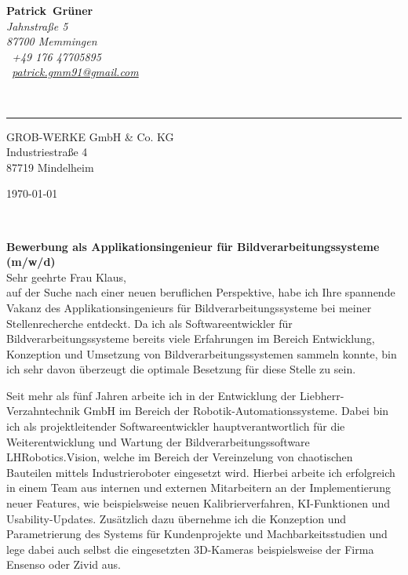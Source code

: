 \documentclass[10pt,a4paper]{article}
\def\firstname{Patrick}
\def\familyname{Grüner}
\begin{document}
\sffamily   %
\hfill%
\begin{minipage}[t]{.6\textwidth}
	\raggedleft%
	{\bfseries {\color{firstnamecolor}\firstname}~{\color{familynamecolor}\familyname}}\\[.35ex]
	\small\itshape%
	Jahnstraße 5\\
	87700 Memmingen\\[.35ex]
	\Mobilefone~+49 176 47705895\\
	\Letter~\href{mailto:patrick.gmm91@gmail.com}{patrick.gmm91@gmail.com}
\end{minipage}\\[0.5em]
%
{\color{firstnamecolor}\rule{\textwidth}{.25ex}}
%
\begin{minipage}[t]{.5\textwidth}
	\raggedright%
	\vspace*{1em}
	GROB-WERKE GmbH \& Co. KG\\[.35ex]
	\small%
	Industriestraße 4  \\
	87719 Mindelheim
\end{minipage}
%
\hfill
%
\begin{minipage}[t]{.4\textwidth}
	\raggedleft %
	\today
\end{minipage}\\[1em]
\raggedright

{\bfseries \color{familynamecolor}Bewerbung als Applikationsingenieur für Bildverarbeitungssysteme (m/w/d)\\[1.5em]}
Sehr geehrte Frau Klaus,\\[1em]
%
auf der Suche nach einer neuen beruflichen Perspektive, habe ich Ihre spannende Vakanz des Applikationsingenieurs für Bildverarbeitungssysteme bei meiner Stellenrecherche entdeckt. Da ich als Softwareentwickler für Bildverarbeitungssysteme bereits viele Erfahrungen im Bereich Entwicklung, Konzeption und Umsetzung von Bildverarbeitungssystemen sammeln konnte, bin ich sehr davon überzeugt die optimale Besetzung für diese Stelle zu sein.

Seit mehr als fünf Jahren arbeite ich in der Entwicklung der Liebherr-Verzahntechnik GmbH im Bereich der Robotik-Automationssysteme. Dabei bin ich als projektleitender Softwareentwickler hauptverantwortlich für die Weiterentwicklung und Wartung der Bildverarbeitungssoftware LHRobotics.Vision, welche im Bereich der Vereinzelung von chaotischen Bauteilen mittels Industrieroboter eingesetzt wird. Hierbei arbeite ich erfolgreich in einem Team aus internen und externen Mitarbeitern an der Implementierung neuer Features, wie beispielsweise neuen Kalibrierverfahren, KI-Funktionen und Usability-Updates. Zusätzlich dazu übernehme ich die Konzeption und Parametrierung des Systems für Kundenprojekte und Machbarkeitsstudien und lege dabei auch selbst die eingesetzten 3D-Kameras beispielsweise der Firma Ensenso oder Zivid aus.
\end{document}
